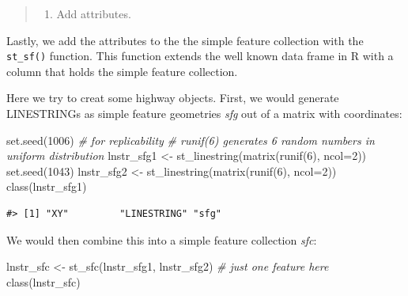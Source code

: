 \documentclass[
  11pt,
]{book}
\newenvironment{Shaded}{\begin{snugshade}}{\end{snugshade}}
\newcommand{\AttributeTok}[1]{\textcolor[rgb]{0.77,0.63,0.00}{#1}}
\newcommand{\CommentTok}[1]{\textcolor[rgb]{0.56,0.35,0.01}{\textit{#1}}}
\newcommand{\DecValTok}[1]{\textcolor[rgb]{0.00,0.00,0.81}{#1}}
\newcommand{\FunctionTok}[1]{\textcolor[rgb]{0.00,0.00,0.00}{#1}}
\newcommand{\NormalTok}[1]{#1}
\newcommand{\OtherTok}[1]{\textcolor[rgb]{0.56,0.35,0.01}{#1}}
\providecommand{\tightlist}{%
  \setlength{\itemsep}{0pt}\setlength{\parskip}{0pt}}
\begin{document}
\begin{quote}
\begin{enumerate}
\def\labelenumi{\Roman{enumi}.}
\setcounter{enumi}{2}
\tightlist
\item
  Add attributes.
\end{enumerate}
\end{quote}

Lastly, we add the attributes to the the simple feature collection with the \texttt{st\_sf()} function. This function extends the well known data frame in R with a column that holds the simple feature collection.

Here we try to creat some highway objects. First, we would generate LINESTRINGs as simple feature geometries \emph{sfg} out of a matrix with coordinates:

\begin{Shaded}
\begin{Highlighting}[]
\FunctionTok{set.seed}\NormalTok{(}\DecValTok{1006}\NormalTok{) }\CommentTok{\# for replicability}
\CommentTok{\# runif(6) generates 6 random numbers in uniform distribution}
\NormalTok{lnstr\_sfg1 }\OtherTok{\textless{}{-}} \FunctionTok{st\_linestring}\NormalTok{(}\FunctionTok{matrix}\NormalTok{(}\FunctionTok{runif}\NormalTok{(}\DecValTok{6}\NormalTok{), }\AttributeTok{ncol=}\DecValTok{2}\NormalTok{)) }
\FunctionTok{set.seed}\NormalTok{(}\DecValTok{1043}\NormalTok{)}
\NormalTok{lnstr\_sfg2 }\OtherTok{\textless{}{-}} \FunctionTok{st\_linestring}\NormalTok{(}\FunctionTok{matrix}\NormalTok{(}\FunctionTok{runif}\NormalTok{(}\DecValTok{6}\NormalTok{), }\AttributeTok{ncol=}\DecValTok{2}\NormalTok{)) }
\FunctionTok{class}\NormalTok{(lnstr\_sfg1)}
\end{Highlighting}
\end{Shaded}

\begin{verbatim}
#> [1] "XY"         "LINESTRING" "sfg"
\end{verbatim}

We would then combine this into a simple feature collection \emph{sfc}:

\begin{Shaded}
\begin{Highlighting}[]
\NormalTok{lnstr\_sfc }\OtherTok{\textless{}{-}} \FunctionTok{st\_sfc}\NormalTok{(lnstr\_sfg1, lnstr\_sfg2) }\CommentTok{\# just one feature here}
\FunctionTok{class}\NormalTok{(lnstr\_sfc)}
\end{Highlighting}
\end{Shaded}
\end{document}
